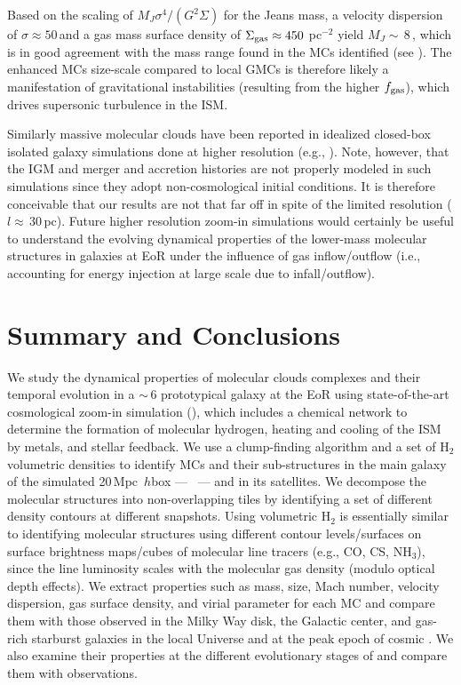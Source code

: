\IfFileExists{emulateapjlegacy.cls}{\documentclass[iop]{emulateapjlegacy}}{\documentclass[iop]{emulateapj}}
\begin{document}
Based on the scaling of $M_J$\eq$\sigma^4/(G^2\Sigma)$ for the Jeans mass,
a velocity dispersion of $\sigma\approx50$\,\kms and a gas mass surface density of
$\Sigma_{\rm gas}\approx450$\,\Msun\,pc$^{-2}$
yield $M_J\sim$\,8\,\Msun, which is in good agreement with the mass range found in the MCs identified (see ).
The enhanced MCs size-scale compared to local GMCs
is therefore likely a manifestation of gravitational instabilities (resulting from the higher $f_{\rm gas}$), which drives
supersonic turbulence in the ISM.

Similarly massive molecular clouds have been reported in idealized closed-box isolated galaxy
simulations done at higher resolution (e.g., \citealt{Behrendt16a}).
Note, however, that the IGM and merger and accretion histories are not properly modeled in such simulations
since they adopt non-cosmological initial conditions.
It is therefore conceivable that our results are not that far off in spite of the limited resolution ($l\approx$\,30\,pc).
Future higher resolution zoom-in simulations would certainly be useful to understand
the evolving dynamical properties of the lower-mass molecular structures in
galaxies at EoR under the influence of gas inflow/outflow (i.e., accounting for energy injection at large scale due to infall/outflow).


\section{Summary and Conclusions}      \label{sec:conclusion}

We study the dynamical properties of molecular clouds complexes and their temporal evolution in a \z$\sim$\,6 prototypical galaxy
at the EoR using state-of-the-art cosmological zoom-in simulation (),
which includes a chemical network to determine the formation of molecular
hydrogen, heating and cooling of the ISM by metals, and stellar feedback.
We use a clump-finding algorithm and a set of H$_2$ volumetric densities
to identify MCs and their sub-structures in the main galaxy of the
simulated 20\,Mpc~$h$\pmOne box --- \flower\ --- and in its satellites.
We decompose the molecular structures into non-overlapping tiles
by identifying a set of different density contours at different snapshots.
Using volumetric H$_2$ is essentially similar to identifying molecular structures using
different contour levels/surfaces on surface brightness maps/cubes of molecular line tracers (e.g., CO, CS, NH$_3$),
since the line luminosity scales with the molecular gas density (modulo optical depth effects).
We extract properties such as mass, size, Mach number, velocity dispersion, gas surface density, and virial parameter for each MC and
compare them with those observed in the Milky Way disk, the Galactic center,
and gas-rich starburst galaxies in the local Universe and at the peak epoch of cosmic \SF.
We also examine their properties at the different evolutionary stages of \flower and compare
them with observations.
\end{document}
